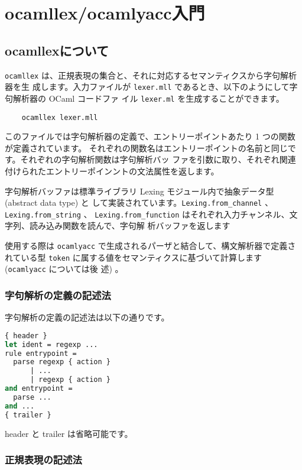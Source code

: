 \documentclass[a4paper,11pt]{jsarticle}
\begin{document}
\newpage
\section{ocamllex/ocamlyacc入門}
\label{intro_lex_yacc}

\subsection{ocamllexについて}

\verb|ocamllex| は、正規表現の集合と、それに対応するセマンティクスから字句解析器を生
成します。入力ファイルが \verb|lexer.mll| であるとき、以下のようにして字句解析器の OCaml
コードファ イル \verb|lexer.ml| を生成することができます。

\begin{lstlisting}
    ocamllex lexer.mll
\end{lstlisting}

このファイルでは字句解析器の定義で、エントリーポイントあたり 1 つの関数が定義されています。
それぞれの関数名はエントリーポイントの名前と同じです。それぞれの字句解析関数は字句解析バッ
ファを引数に取り、それぞれ関連付けられたエントリーポインントの文法属性を返します。

字句解析バッファは標準ライブラリ Lexing モジュール内で抽象データ型 (abstract data type) と
して実装されています。\verb|Lexing.from_channel| 、\verb|Lexing.from_string| 、
\verb|Lexing.from_function| はそれぞれ入力チャンネル、文字列、読み込み関数を読んで、字句解
析バッファを返します

使用する際は \verb|ocamlyacc| で生成されるパーザと結合して、構文解析器で定義されている型
\verb|token| に属する値をセマンティクスに基づいて計算します (\verb|ocamlyacc| については後
述) 。

\subsubsection{字句解析の定義の記述法}

字句解析の定義の記述法は以下の通りです。

\begin{lstlisting}[language=Caml]
{ header }
let ident = regexp ...
rule entrypoint =
  parse regexp { action }
      | ...
      | regexp { action }
and entrypoint =
  parse ...
and ...
{ trailer }
\end{lstlisting}

header と trailer は省略可能です。

\subsubsection{正規表現の記述法}
\end{document}
